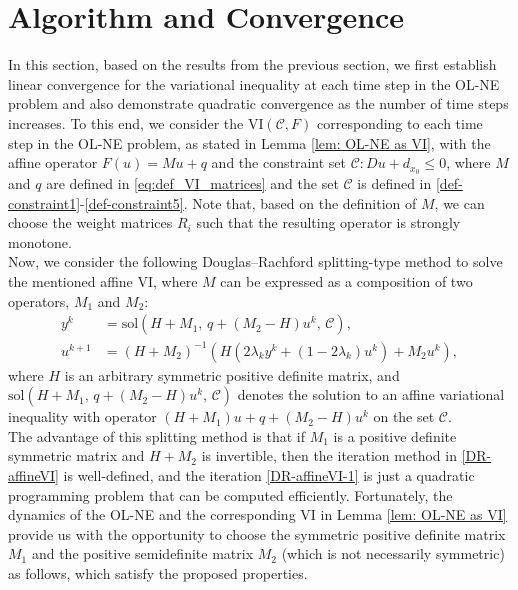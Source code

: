 \documentclass[letterpaper, 10 pt, conference]{ieeeconf}  %
\begin{document}
\section{Algorithm and Convergence}\label{sec:convergence}
In this section, based on the results from the previous section, we first establish linear convergence for the variational inequality at each time step in the OL-NE problem and also demonstrate quadratic convergence as the number of time steps increases. To this end, we consider the \(\mathrm{VI}(\mathcal{C}, F)\) corresponding to each time step in the OL-NE problem, as stated in Lemma \ref{lem: OL-NE as VI}, with the affine operator $F(u) = Mu + q$ and the constraint set $\mathcal{C}: Du + d_{x_0} \leq 0$, where $M$ and $q$ are defined in \eqref{eq:def_VI_matrices} and the set $\mathcal{C}$ is defined in \eqref{def-constraint1}-\eqref{def-constraint5}. Note that, based on the definition of $M$, we can choose the weight matrices $R_i$ such that the resulting operator is strongly monotone.\\
Now, we consider the following Douglas–Rachford splitting-type method to solve the mentioned affine VI, where $M$ can be expressed as a composition of two operators, $M_1$ and $M_2$:
\begin{subequations}\label{DR-affineVI}
\begin{align}
    y^{k} &= \text{sol}\left(H+M_1,\, q+(M_2 - H)u^k,\, \mathcal{C}\right), \label{DR-affineVI-1}\\
    u^{k+1} &= (H+M_2)^{-1}\left(H(2\lambda_k y^{k} + (1-2\lambda_k)u^k) + M_2u^k\right), \label{DR-affineVI-2}
\end{align}
\end{subequations}
where $H$ is an arbitrary symmetric positive definite matrix, and $\text{sol}\left(H + M_1,\, q + (M_2 - H)u^k,\, \mathcal{C}\right)$ denotes the solution to an affine variational inequality with operator $(H + M_1)u + q + (M_2 - H)u^k$ on the set $\mathcal{C}$.\\
The advantage of this splitting method is that if $M_1$ is a positive definite symmetric matrix and $H + M_2$ is invertible, then the iteration method in \eqref{DR-affineVI} is well-defined, and the iteration \eqref{DR-affineVI-1} is just a quadratic programming problem that can be computed efficiently. Fortunately, the dynamics of the OL-NE and the corresponding VI in Lemma \ref{lem: OL-NE as VI} provide us with the opportunity to choose the symmetric positive definite matrix $M_1$ and the positive semidefinite matrix $M_2$ (which is not necessarily symmetric) as follows, which satisfy the proposed properties.
\end{document}
